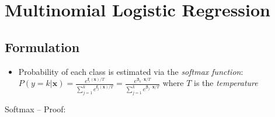 \section{Multinomial Logistic Regression}
\subsection*{Formulation}
\begin{itemize}
    \item Probability of each class is estimated via the \emph{softmax function}:
    $
    P(y=k|\boldsymbol{x}) = \frac{e^{\boldsymbol{f}_i(\boldsymbol{x}) / T}}{\sum_{j=1}^k e^{\boldsymbol{f}_j(\boldsymbol{x}) / T}} = \frac{e^{\boldsymbol{\beta}_k \cdot \boldsymbol{x} / T}}{\sum_{j=1}^k e^{\boldsymbol{\beta}_j \cdot \boldsymbol{x} / T}}
    $ where $T$ is the \emph{temperature}
\end{itemize}
Softmax – Proof:
